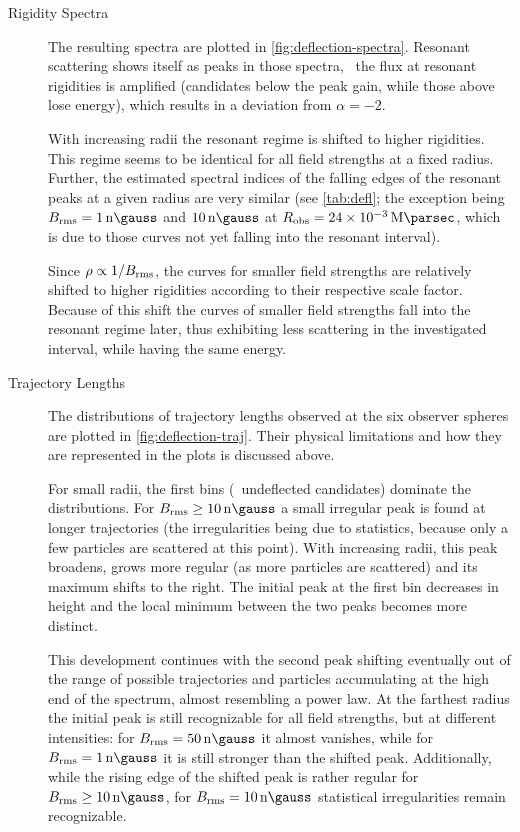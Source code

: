 \begin{description}
    \item[Rigidity Spectra]
        The resulting spectra are plotted in \cref{fig:deflection-spectra}.
        Resonant scattering shows itself as peaks in those spectra,
        \ie~the flux at resonant rigidities is amplified (candidates below the
        peak gain, while those above lose energy), which results in a deviation
        from $\alpha=-2$.

        With increasing radii the resonant regime is shifted to higher
        rigidities.
        This regime seems to be identical for all field strengths at a fixed
        radius. Further, the estimated spectral indices of the falling edges of
        the resonant peaks at a given radius are very similar (see
        \cref{tab:defl}; the exception being $\Brms=\SI{1}{\nano\gauss}$ and
        $\SI{10}{\nano\gauss}$ at $\Robserver=\SI{24e-3}{\mega\parsec}$, which
        is due to those curves not yet falling into the resonant interval).

        Since $\rho\propto1/B_{\mathrm{rms}}$, the curves for smaller field strengths are
        relatively shifted to higher rigidities according to their respective
        scale factor.
        Because of this shift the curves of smaller field strengths fall into
        the resonant regime later, thus exhibiting less scattering in the
        investigated interval, while having the same energy.

    \item[Trajectory Lengths]
        The distributions of trajectory lengths observed at the six observer
        spheres are plotted in \cref{fig:deflection-traj}.
        Their physical limitations and how they are represented in the plots is
        discussed above.

        For small radii, the first bins (\ie~undeflected candidates) dominate
        the distributions. For $\Brms\ge\SI{10}{\nano\gauss}$ a small irregular
        peak is found at longer trajectories (the irregularities being due to
        statistics, because only a few particles are scattered at this point).
        With increasing radii, this peak broadens, grows more regular (as more
        particles are scattered) and its maximum shifts to the right. The
        initial peak at the first bin decreases in height and the local minimum
        between the two peaks becomes more distinct.

        This development continues with the second peak shifting eventually out
        of the range of possible trajectories and particles accumulating at the
        high end of the spectrum, almost resembling a power law.
        At the farthest radius the initial peak is still recognizable for all
        field strengths, but at different intensities: for
        $\Brms=\SI{50}{\nano\gauss}$ it almost vanishes, while for
        $\Brms=\SI{1}{\nano\gauss}$ it is still stronger than the shifted peak.
        Additionally, while the rising edge of the shifted peak is rather
        regular for $\Brms\ge\SI{10}{\nano\gauss}$, for
        $\Brms=\SI{10}{\nano\gauss}$ statistical irregularities remain
        recognizable.


\end{description}
